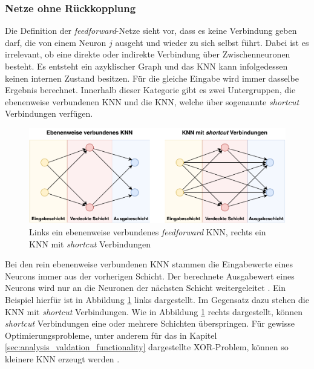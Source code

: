 \subsubsection{Netze ohne Rückkopplung}
Die Definition der \emph{feedforward}-Netze sieht vor, dass es keine Verbindung geben darf, die von einem Neuron $j$ ausgeht und wieder zu sich selbst führt. Dabei ist es irrelevant, ob eine direkte oder indirekte Verbindung über Zwischenneuronen besteht. Es entsteht ein azyklischer Graph \cite{zell2003simulation} und das \ac{KNN} kann infolgedessen keinen internen Zustand besitzen. Für die gleiche Eingabe wird immer dasselbe Ergebnis berechnet. Innerhalb dieser Kategorie gibt es zwei Untergruppen, die ebenenweise verbundenen \ac{KNN} und die \ac{KNN}, welche über sogenannte \emph{shortcut} Verbindungen verfügen.
\begin{figure}[h]
	\centering
	\includegraphics[width=1.0\textwidth]{./img/neural_network_basics/feed_forward_networks.pdf} 
	\caption{Links ein ebenenweise verbundenes \emph{feedforward} KNN, rechts ein KNN mit \emph{shortcut} Verbindungen}
	\label{fig:feed_forward_network_structures}
\end{figure}
Bei den rein ebenenweise verbundenen \ac{KNN} stammen die Eingabewerte eines Neurons immer aus der vorherigen Schicht. Der berechnete Ausgabewert eines Neurons wird nur an die Neuronen der nächsten Schicht weitergeleitet \cite{zell2003simulation}. Ein Beispiel hierfür ist in Abbildung \ref{fig:feed_forward_network_structures} links dargestellt. Im Gegensatz dazu stehen die \ac{KNN} mit \emph{shortcut} Verbindungen. Wie in Abbildung \ref{fig:feed_forward_network_structures} rechts dargestellt, können \emph{shortcut} Verbindungen eine oder mehrere Schichten überspringen. Für gewisse Optimierungsprobleme, unter anderem für das in Kapitel \ref{sec:analysis_valdation_functionality} dargestellte XOR-Problem, können so kleinere \ac{KNN} erzeugt werden \cite{zell2003simulation}. 

